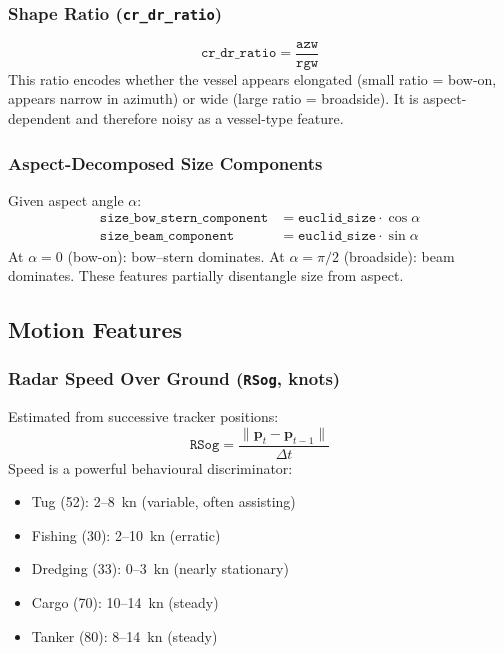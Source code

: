 \documentclass[journal]{IEEEtran}
\newcommand{\vect}[1]{\boldsymbol{#1}}
\begin{document}
\subsubsection{Shape Ratio (\texttt{cr\_dr\_ratio})}

\begin{equation}
  \texttt{cr\_dr\_ratio} = \frac{\texttt{azw}}{\texttt{rgw}}
\end{equation}
This ratio encodes whether the vessel appears elongated (small ratio = bow-on,
appears narrow in azimuth) or wide (large ratio = broadside). It is
aspect-dependent and therefore noisy as a vessel-type feature.

\subsubsection{Aspect-Decomposed Size Components}

Given aspect angle $\alpha$:
\begin{align}
  \texttt{size\_bow\_stern\_component} &= \texttt{euclid\_size} \cdot \cos\alpha \\
  \texttt{size\_beam\_component}       &= \texttt{euclid\_size} \cdot \sin\alpha
\end{align}
At $\alpha=0$ (bow-on): bow--stern dominates. At $\alpha=\pi/2$ (broadside):
beam dominates. These features partially disentangle size from aspect.

\subsection{Motion Features}

\subsubsection{Radar Speed Over Ground (\texttt{RSog}, knots)}

Estimated from successive tracker positions:
\begin{equation}
  \texttt{RSog} = \frac{\|\vect{p}_t - \vect{p}_{t-1}\|}{\Delta t}
\end{equation}
Speed is a powerful behavioural discriminator:
\begin{itemize}
  \item Tug (52): 2--8~kn (variable, often assisting)
  \item Fishing (30): 2--10~kn (erratic)
  \item Dredging (33): 0--3~kn (nearly stationary)
  \item Cargo (70): 10--14~kn (steady)
  \item Tanker (80): 8--14~kn (steady)
\end{itemize}
\end{document}
